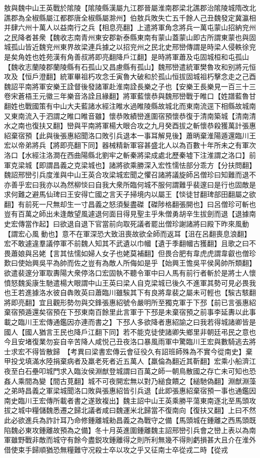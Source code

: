 敖與魏中山王英戰於隂陵【隂陵縣漢屬九江郡晉屬淮南郡梁北譙郡治隂陵城隋改北譙郡為全椒縣屬江都郡唐全椒縣屬滁州】伯敖兵敗失亡五千餘人己丑魏發定冀瀛相并肆六州十萬人以益南行之兵【相息亮翻】上遣將軍角念將兵一萬屯蒙山招納兖州之民降者甚衆【魏收志南青州東安郡新泰縣東南有蒙山蓋蒙山即古所謂東蒙也與固城孤山皆近魏兖州東界故梁連兵據之以招兖州之民北史邢巒傳謂是時梁人侵軼徐兖是矣角姓也姓苑漢有角善叔將即亮翻降戶江翻】是時將軍蕭及屯固城桓和屯孤山【魏收志蘭陵郡蘭陵縣有石孤山又昌慮縣有孤山】魏邢巒遣統軍樊魯攻和别將元恒攻及【恒戶澄翻】統軍畢祖朽攻念壬寅魯大破和於孤山恒拔固城祖朽擊念走之己酉魏詔平南將軍安樂王詮督後發諸軍赴淮南詮長樂之子也【安樂王長樂見一百三十三卷宋蒼梧王元徽三年樂音洛詮且緣翻】將軍藍懷恭與魏邢巒戰于睢口【姓譜藍魯甘翻姓也戰國策有中山大夫藍諸水經注睢水過睢陵縣故城北而東南流逕下相縣故城南又東南流入于泗謂之睢口睢音雖】懷恭敗績巒進圍宿預懷恭復于清南築城【清南清水之南也復扶又翻】巒與平南將軍楊大眼合攻之九月癸酉拔之斬懷恭殺獲萬計張惠紹棄宿預【此與後張惠紹聞洛口敗引兵退本一事耳解見後】蕭昞棄淮陽遁還臨川王宏以帝弟將兵【將即亮翻下同】器械精新軍容甚盛北人以為百數十年所未之有軍次洛口【水經注洛澗在西曲陽縣北劉牢之斬秦將梁成處北歷秦墟下注淮謂之洛口】前軍克梁城【即謂昌義之克梁城也】諸將欲乘勝深入宏性懦怯部分乖方【分扶問翻】魏詔邢巒引兵度淮與中山王英合攻梁城宏聞之懼召諸將議旋師呂僧珍曰知難而退不亦善乎宏曰我亦以為然柳惔曰自我大衆所臨何城不服何謂難乎裴邃曰是行也固敵是求何難之避馬仙琕曰王安得亡國之言天子掃境内以屬王【惔徒甘翻琕部田翻屬之欲翻】有前死一尺無却生一寸昌義之怒須髮盡磔【磔陟格翻張開也】曰呂僧珍可斬也豈有百萬之師出未逢敵望風遽退何面目得見聖主乎朱僧勇胡辛生拔劍而退【退據南史宏傳當作起】曰欲退自退下官當前向取死議者罷出僧珍謝諸將曰殿下昨來風動【謂宏心風動也】意不在軍深恐大致沮喪故欲全師而返耳【沮在呂翻喪息浪翻】宏不敢遽違羣議停軍不前魏人知其不武遺以巾幗【遺于季翻幗古獲翻】且歌之曰不畏蕭娘與呂姥【言其怯懦如婦人女子也姥莫補翻】但畏合肥有韋虎虎謂韋叡也僧珍歎曰使始興吳平為帥而佐之豈有為敵人所侮如是乎【始興王憺吳平侯昺帥所類翻】欲遣裴邃分軍取夀陽大衆停洛口宏固執不聽令軍中曰人馬有前行者斬於是將士人懷憤怒魏奚康生馳遣楊大眼謂中山王英曰梁人自克梁城已後久不進軍其勢可見必畏我也王若進據洛水彼自犇敗英曰蕭臨川雖騃其下有良將韋裴之屬未可輕也【騃古駭翻將即亮翻】宜且觀形勢勿與交鋒張惠紹號令嚴明所至獨克軍于下邳【前已言張惠紹棄宿預遁還矣宿預在下邳東南百餘里此言軍于下邳是未棄宿預之前事李延夀以此事載之臨川王宏傳通鑑因亦連而書之】下邳人多欲降者惠紹諭之曰我若得城諸卿皆是國人【國人猶言王民也降戶江翻下同】若不能克徒使諸卿失鄉里非朝廷弔民之意也今且安堵復業勿妄自辛苦降人咸悦己丑夜洛口暴風雨軍中驚臨川王宏與數騎逃去將士求宏不得皆散歸　【考異曰梁書宏傳云會征役久有詔班師殊為不實今從南史】棄甲投戈填滿水陸捐棄病者及羸老死者近五萬人【羸倫為翻近其靳翻】宏乘小船濟江夜至白石壘叩城門求入臨汝侯淵猷登城謂曰百萬之師一朝鳥散國之存亡未可知也恐姦人乘間為變【間古莧翻】城不可夜開宏無以對乃縋食饋之【縋馳偽翻】淵猷淵藻之弟時昌義之軍梁城聞洛口敗與張惠紹皆引兵退【此即張惠紹棄宿預一事也通鑑因南史臨川王宏傳所載者書之遂致複出】魏主詔中山王英乘勝平蕩東南逐北至馬頭攻拔之城中糧儲魏悉遷之歸北議者咸曰魏運米北歸當不復南向【復扶又翻】上曰不然此必欲進兵為詐計耳乃命修鍾離城勑昌義之為戰守之備【馬頭城在鍾離之西馬頭既陷魏必東攻鍾離故預為之備】冬十月英進圍鍾離魏主詔邢巒引兵會之巒上表以為南軍雖野戰非敵而城守有餘今盡鋭攻鍾離得之則所利無幾不得則虧損甚大且介在淮外借使束手歸順猶恐無糧難守况殺士卒以攻之乎又征南士卒從戎二時【從戎